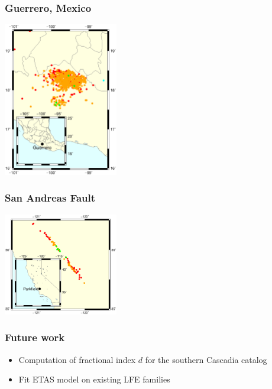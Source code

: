 \documentclass{beamer}
\begin{document}
	\begin{frame}
		\frametitle{Guerrero, Mexico}
		\begin{center}
			\includegraphics[width=5cm, trim={1cm 2cm 6cm 8cm}, clip]{other/guerrero.eps}
		\end{center}
	\end{frame}

	\begin{frame}
		\frametitle{San Andreas Fault}
		\begin{center}
			\includegraphics[width=5cm, trim={1cm 2cm 1cm 4cm}, clip]{other/sanandreas.eps}
		\end{center}
	\end{frame}

	\begin{frame}
		\frametitle{Future work}
		\begin{itemize}
			\item Computation of fractional index $d$ for the southern Cascadia catalog
			\item Fit ETAS model on existing LFE families
		\end{itemize}
	\end{frame}
		
\end{document}
